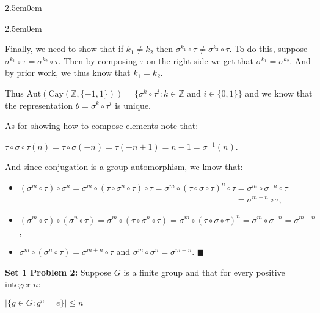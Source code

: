 \documentclass{book}
\newenvironment{myIndent}{%
   \begin{adjustwidth}{2.5em}{0em}%
}{%
   \end{adjustwidth}%
}
\newcommand{\blab}[1]{\textbf{#1}}
\newcommand{\Cay}{\ensuremath{\mathrm{Cay}}}
\newcommand{\Aut}{\mathrm{Aut}}
\newcommand{\retTwo}{\hfill\bigbreak}
\begin{document}
\begin{myIndent}
\begin{myIndent}
		Finally, we need to show that if $k_1 \neq k_2$ then $\sigma^{k_1} \circ \tau \neq \sigma^{k_2} \circ \tau$. To do this, suppose $\sigma^{k_1} \circ \tau = \sigma^{k_2} \circ \tau$. Then by composing $\tau$ on the right side we get that $\sigma^{k_1} = \sigma^{k_2}$. And by prior work, we thus know that $k_1 = k_2$.\retTwo
	\end{myIndent}

	Thus $\Aut(\Cay(\mathbb{Z}, \{-1, 1\})) = \{\sigma^k \circ \tau^i : k \in \mathbb{Z} \text{ and } i \in \{0, 1\}\}$ and we know that the representation $\theta = \sigma^k \circ \tau^i$ is unique.\retTwo

	As for showing how to compose elements note that:

	{\centering $\tau \circ \sigma \circ \tau(n) = \tau \circ \sigma(-n) = \tau(-n + 1) = n - 1 = \sigma^{-1}(n)$.\retTwo\par}

	And since conjugation is a group automorphism, we know that:
	\begin{itemize}
		\item $(\sigma^m \circ \tau) \circ \sigma^n = \sigma^m \circ (\tau \circ \sigma^n \circ \tau) \circ \tau = \sigma^m \circ (\tau \circ \sigma \circ \tau)^n \circ \tau = \sigma^m \circ \sigma^{-n} \circ \tau$\\ [3pt]
		$\phantom{(\sigma^m \circ \tau) \circ \sigma^n = \sigma^m \circ (\tau \circ \sigma^n \circ \tau) \circ \tau = \sigma^m \circ (\tau \circ \sigma \circ \tau)^n \circ \tau} = \sigma^{m-n} \circ \tau$,\\

		\item $(\sigma^m \circ \tau) \circ (\sigma^n \circ \tau) = \sigma^m \circ (\tau \circ \sigma^n \circ \tau) = \sigma^m \circ (\tau \circ \sigma \circ \tau)^n = \sigma^m \circ \sigma^{-n} = \sigma^{m - n}$,\\

		\item $\sigma^m \circ (\sigma^n \circ \tau) = \sigma^{m + n} \circ \tau$ and $\sigma^m \circ \sigma^n = \sigma^{m + n}$. $\blacksquare$\retTwo
	\end{itemize}
\end{myIndent}

\blab{Set 1 Problem 2:} Suppose $G$ is a finite group and that for every positive integer $n$:\\ [-16pt]

{\center$|\{g \in G : g^n = e\}| \leq n$\\ [9pt]\par}
\end{document}
